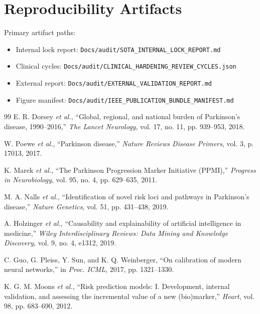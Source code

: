 \documentclass[conference]{IEEEtran}
\begin{document}
\section*{Reproducibility Artifacts}
Primary artifact paths:
\begin{itemize}
\item Internal lock report: \texttt{Docs/audit/SOTA\_INTERNAL\_LOCK\_REPORT.md}
\item Clinical cycles: \texttt{Docs/audit/CLINICAL\_HARDENING\_REVIEW\_CYCLES.json}
\item External report: \texttt{Docs/audit/EXTERNAL\_VALIDATION\_REPORT.md}
\item Figure manifest: \texttt{Docs/audit/IEEE\_PUBLICATION\_BUNDLE\_MANIFEST.md}
\end{itemize}

\begin{thebibliography}{99}
E. R. Dorsey \emph{et al.}, ``Global, regional, and national burden of Parkinson's disease, 1990--2016,'' \emph{The Lancet Neurology}, vol. 17, no. 11, pp. 939--953, 2018.

W. Poewe \emph{et al.}, ``Parkinson disease,'' \emph{Nature Reviews Disease Primers}, vol. 3, p. 17013, 2017.

K. Marek \emph{et al.}, ``The Parkinson Progression Marker Initiative (PPMI),'' \emph{Progress in Neurobiology}, vol. 95, no. 4, pp. 629--635, 2011.

M. A. Nalls \emph{et al.}, ``Identification of novel risk loci and pathways in Parkinson's disease,'' \emph{Nature Genetics}, vol. 51, pp. 431--438, 2019.

A. Holzinger \emph{et al.}, ``Causability and explainability of artificial intelligence in medicine,'' \emph{Wiley Interdisciplinary Reviews: Data Mining and Knowledge Discovery}, vol. 9, no. 4, e1312, 2019.

C. Guo, G. Pleiss, Y. Sun, and K. Q. Weinberger, ``On calibration of modern neural networks,'' in \emph{Proc. ICML}, 2017, pp. 1321--1330.

K. G. M. Moons \emph{et al.}, ``Risk prediction models: I. Development, internal validation, and assessing the incremental value of a new (bio)marker,'' \emph{Heart}, vol. 98, pp. 683--690, 2012.
\end{thebibliography}
\end{document}
